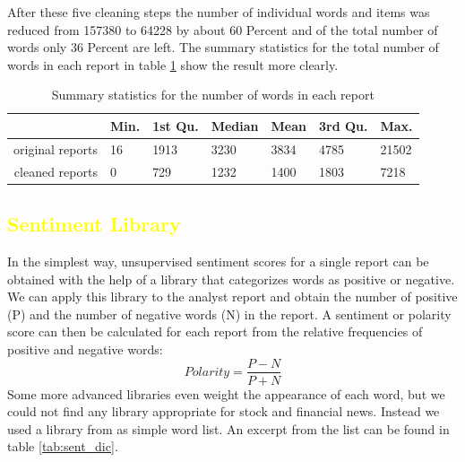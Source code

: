 After these five cleaning steps the number of individual words and items was reduced from 157380 to 64228 by about 60 Percent and of the total number of words only 36 Percent are left. The summary statistics for the total number of words in each report in table \ref{tab:summaryCR} show the result more clearly. 
\begin{table}[ht]
\centering
\begin{tabular}{rllllll}
  \hline
  & Min. & 1st Qu. & Median  &  Mean & 3rd Qu. &   Max. \\
  \hline
  original reports & 16  &  1913  &  3230 &   3834  &  4785  & 21502  \\ 
  cleaned reports  & 0   &  729  &  1232  &  1400  &  1803  &  7218  \\ 
   \hline
\end{tabular}
\caption{Summary statistics for the number of words in each report}
\label{tab:summaryCR}
\end{table}


\subsection{\textcolor{yellow}{Sentiment Library}}\label{BoW}
In the simplest way, unsupervised sentiment scores for a single report can be obtained with the help of a library that categorizes words as positive or negative. We can apply this library to the analyst report and obtain the number of positive (P) and the number of negative words (N) in the report. A sentiment or polarity score can then be calculated for each report from the relative frequencies of positive and negative words: 
\begin{equation}
    Polarity = \frac{P - N}{P + N}
\end{equation}
Some more advanced libraries even weight the appearance of each word, but we could not find any library appropriate for stock and financial news. Instead we used a library from \citet{sent_dictionary} as simple word list. An excerpt from the list can be found in table \ref{tab:sent_dic}. 

